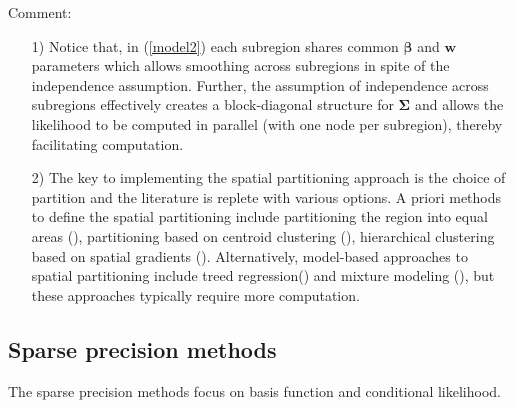 \documentclass[
12pt, %
a4paper, %
oneside, %
headinclude,footinclude, %
BCOR5mm, %
]{scrartcl}
\begin{document}
\textcolor[rgb]{1.00,0.00,1.00}{Comment:}
\begin{itemize}
 \item [1)] Notice that, in (\ref{model2}) each subregion shares common $\boldsymbol{\beta}$ and $\boldsymbol{w}$ parameters which allows smoothing across subregions in spite of the independence assumption. Further, the assumption of independence across subregions effectively creates a block-diagonal structure for $\boldsymbol{\Sigma}$ and allows the likelihood to be computed in parallel (with one node per subregion), thereby facilitating computation.
 \item [2)] The key to implementing the spatial partitioning approach is the choice of partition and the literature is replete with various options.
  A priori methods to define the spatial
partitioning include partitioning the region into equal areas (\href{https://chenyw68.github.io/Literature/[2011]Covariance approximation for large multivariate spatial data sets.pdf}{\citep{sang2011covariance}}), partitioning based on centroid clustering (\href{https://chenyw68.github.io/Literature/[2005]Analyzing nonstationary spatial data using piecewise Gaussian processes.pdf}{\citep{kim2005analyzing}}), hierarchical clustering based on spatial gradients (\href{https://chenyw68.github.io/Literature/[2017]Nonstationary GP Models Using Spatial Hierarchical Clustering from Finite Differences.pdf}{\citep{heaton2017nonstationary}}). Alternatively, model-based approaches to spatial partitioning include treed regression(\href{https://chenyw68.github.io/Literature/[2014]Adaptive Bayesian Nonstationary Modeling for Large Spatial Datasets.pdf}{\citep{konomi2014adaptive}}) and mixture modeling (\href{https://chenyw68.github.io/Literature/[2014]A multivariate spatial mixture model for areal data.pdf}{\citet{neelon2014multivariate}}), but these approaches typically require more computation.
\end{itemize}


\subsection{Sparse precision methods}
The sparse precision methods focus on basis function and conditional likelihood.
\end{document}
